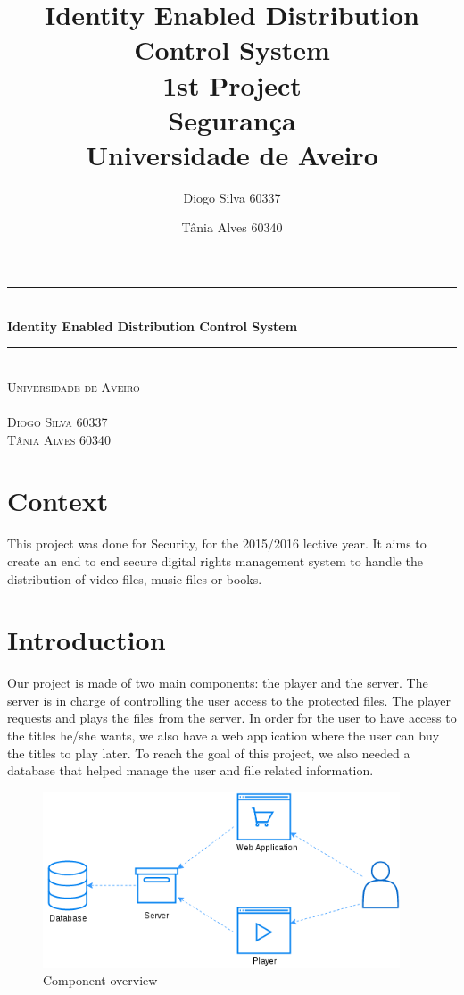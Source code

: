 \documentclass[11pt,a4paper]{report}
\title{\textbf{Identity Enabled Distribution Control System} \\1st Project\\ Segurança\\Universidade de Aveiro}
\author{Diogo Silva 60337 \and Tânia Alves 60340 }
\newcommand{\HRule}{\rule{\linewidth}{0.5mm}}
\begin{document}
\begin{titlepage}
\begin{center}
\HRule \\[0.4cm]
{ \huge \bfseries Identity Enabled Distribution Control System \\[0.4cm] }
\HRule \\[1.5cm]
\textsc{\LARGE Universidade de Aveiro}\\[1.5cm]
\textsc{}\\[1.5cm]
\textsc{Diogo Silva 60337 \\Tânia Alves 60340 }
\end{center}
\end{titlepage}
\maketitle
\tableofcontents
\nocite{*}
\chapter*{Context}
This project was done for Security, for the 2015/2016 lective year.
It aims to create an end to end secure digital rights management system to handle the distribution of video files, music files or books.

\chapter*{Introduction}

Our project is made of two main components: the player and the server.
The server is in charge of controlling the user access to the protected files. 
The player requests and plays the files from the server.
In order for the user to have access to the titles he/she wants, we also have a web application where the user can buy the titles to play later.
To reach the goal of this project, we also needed a database that helped manage the user and file related information.

\begin{figure}[H]
\centerline{\includegraphics[width=300pt]{images/overview.png}}
\caption{Component overview}
\label{schema}
\end{figure}
\end{document}
